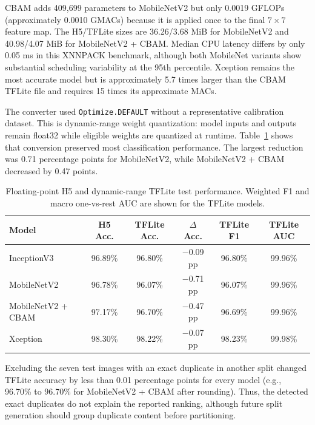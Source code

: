 CBAM adds 409,699 parameters to MobileNetV2 but only 0.0019 GFLOPs (approximately 0.0010 GMACs) because it is applied once to the final $7\times7$ feature map. The H5/TFLite sizes are 36.26/3.68 MiB for MobileNetV2 and 40.98/4.07 MiB for MobileNetV2 + CBAM. Median CPU latency differs by only 0.05 ms in this XNNPACK benchmark, although both MobileNet variants show substantial scheduling variability at the 95th percentile. Xception remains the most accurate model but is approximately 5.7 times larger than the CBAM TFLite file and requires 15 times its approximate MACs.

The converter used \texttt{Optimize.DEFAULT} without a representative calibration dataset. This is dynamic-range weight quantization: model inputs and outputs remain float32 while eligible weights are quantized at runtime. Table~\ref{tab:quantized_accuracy} shows that conversion preserved most classification performance. The largest reduction was 0.71 percentage points for MobileNetV2, while MobileNetV2 + CBAM decreased by 0.47 points.

\begin{table}[H]
\caption{Floating-point H5 and dynamic-range TFLite test performance. Weighted F1 and macro one-vs-rest AUC are shown for the TFLite models.}
\label{tab:quantized_accuracy}
\centering
\small
\begin{tabularx}{\textwidth}{l c c c c c}
\toprule
\textbf{Model} & \textbf{H5 Acc.} & \textbf{TFLite Acc.} & \textbf{$\Delta$ Acc.} & \textbf{TFLite F1} & \textbf{TFLite AUC} \\
\midrule
InceptionV3 & 96.89\% & 96.80\% & $-$0.09 pp & 96.80\% & 99.96\% \\
MobileNetV2 & 96.78\% & 96.07\% & $-$0.71 pp & 96.07\% & 99.96\% \\
MobileNetV2 + CBAM & 97.17\% & 96.70\% & $-$0.47 pp & 96.69\% & 99.96\% \\
Xception & 98.30\% & 98.22\% & $-$0.07 pp & 98.23\% & 99.98\% \\
\bottomrule
\end{tabularx}
\normalsize
\end{table}

Excluding the seven test images with an exact duplicate in another split changed TFLite accuracy by less than 0.01 percentage points for every model (e.g., 96.70\% to 96.70\% for MobileNetV2 + CBAM after rounding). Thus, the detected exact duplicates do not explain the reported ranking, although future split generation should group duplicate content before partitioning.

